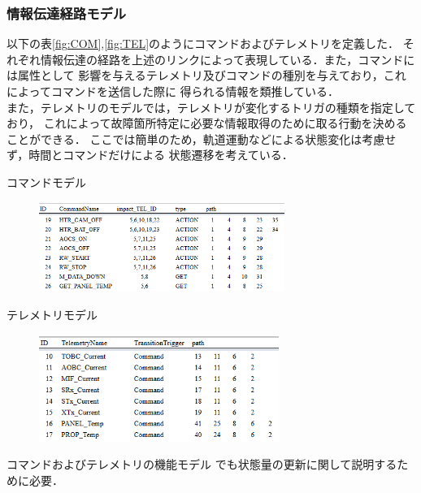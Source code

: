 \documentclass[11pt]{jsarticle}%
\begin{document}
\begin{multicols}{2}
\vspace{-2zh}
\subsubsection{情報伝達経路モデル}
以下の表\ref{fig:COM},\ref{fig:TEL}のようにコマンドおよびテレメトリを定義した．
それぞれ情報伝達の経路を上述のリンクによって表現している．また，コマンドには属性として
影響を与えるテレメトリ及びコマンドの種別を与えており，これによってコマンドを送信した際に
得られる情報を類推している．\\%
また，テレメトリのモデルでは，テレメトリが変化するトリガの種類を指定しており，
これによって故障箇所特定に必要な情報取得のために取る行動を決めることができる．
ここでは簡単のため，軌道運動などによる状態変化は考慮せず，時間とコマンドだけによる
状態遷移を考えている．

\begin{table}[H]
  \centering
  \caption{コマンドモデル}
  \label{fig:COM}
\end{table}
\vspace{-3zh}
\begin{figure}[H]
  \centering
    \includegraphics[width=8cm]{../figure/COM_resume.png}
\end{figure}

\begin{table}[H]
  \centering
  \caption{テレメトリモデル}
  \label{fig:TEL}
\end{table}
\vspace{-3zh}
\begin{figure}[H]
  \centering
    \includegraphics[height=3.5cm]{../figure/TEL_resume.png}
\end{figure}

コマンドおよびテレメトリの機能モデル%
でも状態量の更新に関して説明するために必要．


\end{multicols}
\end{document}

